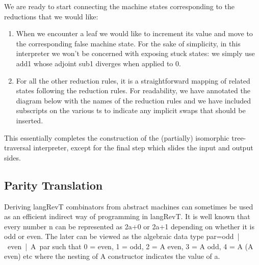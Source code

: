 \documentclass{llncs}
\begin{document}
We are ready to start connecting the machine states corresponding to
the reductions that we would like:
\begin{enumerate}
\item When we encounter a leaf we would like to increment its value and move
  to the corresponding {{false}} machine state. For the sake of simplicity, in
  this interpreter we won't be concerned with exposing stuck states: we
  simply use {{add1}} whose adjoint {{sub1}} diverges when applied to {{0}}.

\item For all the other reduction rules, it is a straightforward mapping of
  related states following the reduction rules. For readability, we have
  annotated the diagram below with the names of the reduction rules and we
  have included subscripts on the various {{t}}s to indicate any implicit
  swaps that should be inserted.

\end{enumerate}


\begin{center}
\end{center}

This essentially completes the construction of the (partially) isomorphic
tree-traversal interpreter, except for the final step which slides the input
and output sides. 


\subsection{Parity Translation }
\label{sec:parity-int}

Deriving {{langRevT}} combinators from abstract machines can sometimes
be used as an efficient indirect way of programming in {{langRevT}}.
It is well known that every number {{n}} can be represented as
{{2a+0}} or {{2a+1}} depending on whether it is odd or even.  The
later can be viewed as the algebraic data type
{{par=odd~|~even~|~A~par}} such that 
{{0 = even, 1 = odd, 2 = A even, 3 = A odd, 4 = A (A even)}} etc where
the nesting of {{A}} constructor indicates the value of {{a}}.
\end{document}
